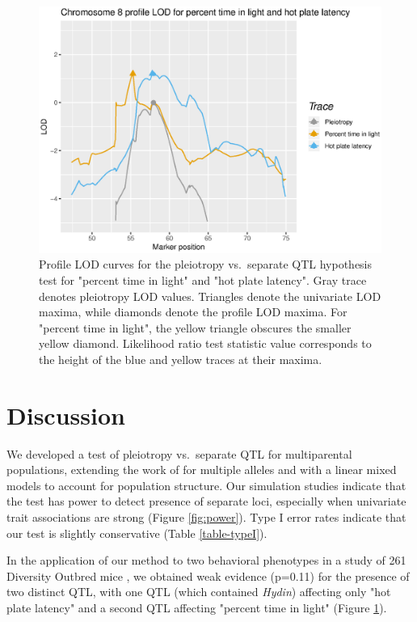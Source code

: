 \documentclass[12pt,twoside, lineno]{gsajnl}
\begin{document}
\begin{figure}
\includegraphics[width = \textwidth]{../Rmd/profile.eps}
\caption{Profile LOD curves for the pleiotropy vs.\ separate QTL
  hypothesis test for "percent time in light" and "hot plate latency".
  Gray trace denotes pleiotropy LOD values. Triangles denote the
  univariate LOD maxima, while diamonds denote the profile LOD maxima.
  For "percent time in light", the yellow triangle obscures the
  smaller yellow diamond. Likelihood ratio test statistic value
  corresponds to the height of the blue and yellow traces at their
  maxima.}
\label{fig:profiles}
\end{figure}








\section{Discussion}

We developed a test of pleiotropy vs.\ separate QTL for multiparental
populations, extending the work of \citet{jiang1995multiple} for
multiple alleles and with a linear mixed models to account for
population structure. Our simulation
studies indicate that the test has power to detect presence of
separate loci, especially when univariate trait associations are
strong (Figure \ref{fig:power}). Type I error rates indicate that our
test is slightly conservative (Table \ref{table-typeI}).

In the application of our method to two behavioral phenotypes in a
study of 261 Diversity Outbred mice
\citep{recla2014precise,logan2013high}, we obtained weak evidence
(p=0.11) for the presence of two distinct QTL, with one QTL (which
contained \textit{Hydin}) affecting only "hot plate latency" and a
second QTL affecting "percent time in light" (Figure
\ref{fig:profiles}).
\end{document}
